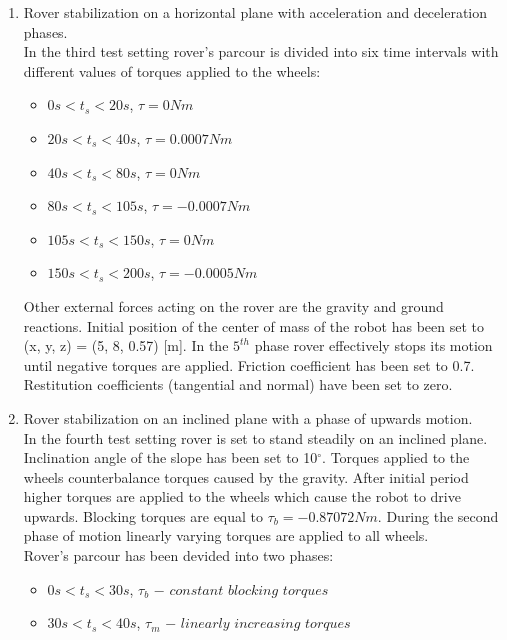 \documentclass[a4paper]{article}
\begin{document}
\begin{enumerate}
  \item Rover stabilization on a horizontal plane with acceleration and deceleration phases.\\[1mm]
        In the third test setting rover's parcour is divided into six time intervals with different values of torques applied to the wheels:

        \begin{itemize} 
          \item $0s < t_s < 20s$, $\tau = 0Nm$           
          \item $20s < t_s < 40s$, $\tau = 0.0007Nm$        
          \item $40s < t_s < 80s$, $\tau = 0Nm$         
          \item $80s < t_s < 105s$, $\tau = -0.0007Nm$
          \item $105s < t_s < 150s$, $\tau = 0Nm$         
          \item $150s < t_s < 200s$, $\tau = -0.0005Nm$ 
        \end{itemize}

        \noindent Other external forces acting on the rover are the gravity and ground reactions. Initial position of the center of mass of the robot
        has been set to (x, y, z) = (5, 8, 0.57) [m]. In the $5^{th}$ phase rover effectively stops its motion until negative torques are applied.
        Friction coefficient has been set to 0.7. Restitution coefficients (tangential and normal) have been set to zero. 

  \item Rover stabilization on an inclined plane with a phase of upwards motion.\\[1mm]
        In the fourth test setting rover is set to stand steadily on an inclined plane.   
        Inclination angle of the slope has been set to 10$^\circ$. Torques applied to the wheels counterbalance torques caused by
        the gravity. After initial period higher torques are applied to the wheels which cause the robot to drive upwards. Blocking torques are equal to  
        $\tau_{b} = -0.87072Nm$. During the second phase of motion linearly varying torques are applied to all wheels.\\[1mm] 
        \noindent Rover's parcour has been devided into two phases:

        \begin{itemize} 
          \item $0s < t_s < 30s$, $\tau_{b}$ $-$  $constant$ $blocking$ $torques$           
          \item $30s < t_s < 40s$, $\tau_{m}$ $-$ $linearly$ $increasing$ $torques$        
        \end{itemize}


\end{enumerate}
\end{document}
